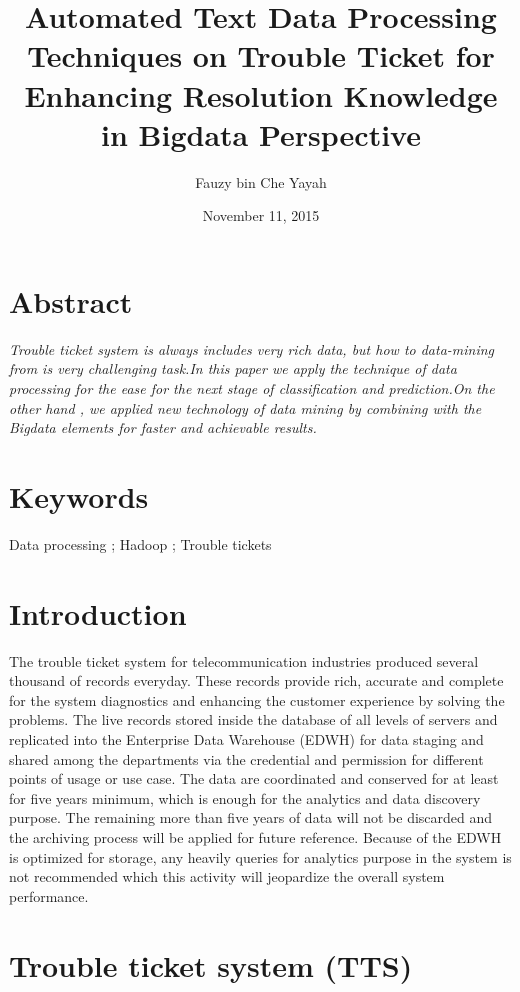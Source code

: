 \documentclass[]{article}
\title{Automated Text Data Processing Techniques on Trouble Ticket for
Enhancing Resolution Knowledge in Bigdata Perspective}
\author{Fauzy bin Che Yayah}
\date{November 11, 2015}
\begin{document}
\maketitle


\section{Abstract}\label{abstract}

\emph{Trouble ticket system is always includes very rich data, but how
to data-mining from is very challenging task.In this paper we apply the
technique of data processing for the ease for the next stage of
classification and prediction.On the other hand , we applied new
technology of data mining by combining with the Bigdata elements for
faster and achievable results.}

\section{Keywords}\label{keywords}

Data processing ; Hadoop ; Trouble tickets

\section{Introduction}\label{introduction}

The trouble ticket system for telecommunication industries produced
several thousand of records everyday. These records provide rich,
accurate and complete for the system diagnostics and enhancing the
customer experience by solving the problems. The live records stored
inside the database of all levels of servers and replicated into the
Enterprise Data Warehouse (EDWH) for data staging and shared among the
departments via the credential and permission for different points of
usage or use case. The data are coordinated and conserved for at least
for five years minimum, which is enough for the analytics and data
discovery purpose. The remaining more than five years of data will not
be discarded and the archiving process will be applied for future
reference. Because of the EDWH is optimized for storage, any heavily
queries for analytics purpose in the system is not recommended which
this activity will jeopardize the overall system performance.

\section{Trouble ticket system (TTS)}\label{trouble-ticket-system-tts}
\end{document}

